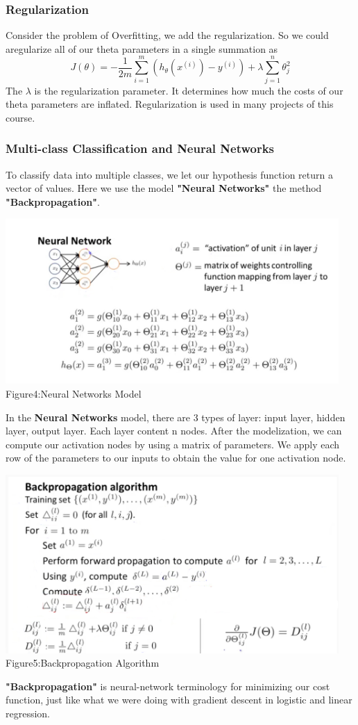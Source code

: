\documentclass[a4paper]{article}
\begin{document}
{\subsubsection{\textbf{Regularization}}
 Consider the problem of Overfitting, we add the regularization. So we could aregularize all of our theta parameters in a single summation as$$J(\theta)=-\frac{1}{2m}\sum_{i=1}^{m}(h_\theta(x^{(i)})-y^{(i)})+\lambda\sum_{j=1}^n\theta_j^2$$
The $\lambda$ is the regularization parameter. It determines how much the costs of our theta parameters are inflated.
Regularization is used in many projects of this course.
\subsubsection{\textbf{Multi-class Classification and Neural Networks}}
To classify data into multiple classes, we let our hypothesis function return a vector of values. Here we use the model \textbf{"Neural Networks"} the method \textbf{"Backpropagation"}.
\begin{center}
\includegraphics[width=5in]{nn.png}\\
Figure4:Neural Networks Model
\end{center}
In the \textbf{Neural Networks} model, there are 3 types of layer: input layer, hidden layer, output layer. Each layer content n nodes. After the modelization, we can compute our activation nodes by using a matrix of parameters. We apply each row of the parameters to our inputs to obtain the value for one activation node.\\
\begin{center}
\includegraphics[width=5in]{back.png}\\
Figure5:Backpropagation Algorithm
\end{center}
\textbf{"Backpropagation"} is neural-network terminology for minimizing our cost function, just like what we were doing with gradient descent in logistic and linear regression. 

}
\end{document}
